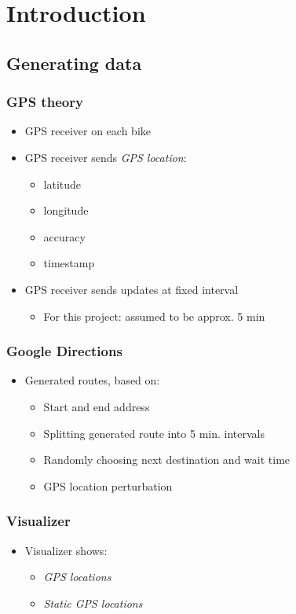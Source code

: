 \section{Introduction}

\subsection{Generating data}

\begin{frame}
\frametitle{GPS theory}

\begin{itemize}
\item GPS receiver on each bike
\item GPS receiver sends \textit{GPS location}:
  \begin{itemize}
  \item latitude
  \item longitude
  \item accuracy
  \item timestamp
  \end{itemize}
\item GPS receiver sends updates at fixed interval
  \begin{itemize}
  \item For this project: assumed to be approx. 5 min
  \end{itemize}
\end{itemize}

\end{frame}

\begin{frame}
\frametitle{Google Directions}

\begin{itemize}
\item Generated routes, based on:
  \begin{itemize}
  \item Start and end address
  \item Splitting generated route into 5 min. intervals
  \item Randomly choosing next destination and wait time
  \item GPS location perturbation
  \end{itemize}
\end{itemize}

\end{frame}

\begin{frame}
\frametitle{Visualizer}

\begin{itemize}
\item Visualizer shows:
  \begin{itemize}
  \item \textit{GPS locations}
  \item \textit{Static GPS locations}
  \end{itemize}
\end{itemize}

\end{frame}

